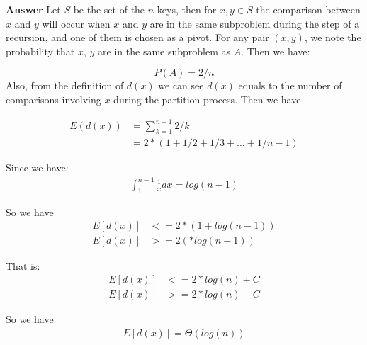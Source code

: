 \documentclass[12pt]{article}
\begin{document}
\textbf{Answer}
Let $S$ be the set of the $n$ keys, then for $x,y \in S$ the comparison between $x$ and $y$ will occur when $x$ and $y$ are in the same subproblem during the step of a recursion, and one of them is chosen as a pivot. For any pair $(x,y)$, we note the probability that $x$, $y$ are in the same subproblem as $A$. Then we have:

\begin{equation}
P(A) = 2/n
\end{equation}
Also, from the definition of $d(x)$ we can see $d(x)$ equals to the number of comparisons involving $x$ during the partition process. Then we have 

\begin{equation}
\begin{aligned}
E(d(x)) &= \sum_{k=1}^{n-1} 2/k\\
&= 2*(1 + 1/2 + 1/3 + ... + 1/n-1)
\end{aligned}
\end{equation}

Since we have:
\begin{equation}
\begin{aligned}
\int_{1}^{n-1} \frac{1}{x} dx = log(n-1)
\end{aligned}
\end{equation}

So we have
\begin{equation}
\begin{aligned}
E[d(x)] &<= 2*(1 + log(n-1))\\
E[d(x)] &>= 2(*log(n-1))
\end{aligned}
\end{equation}

That is:
\begin{equation}
\begin{aligned}
E[d(x)] &<= 2*log(n) + C\\
E[d(x)] &>= 2*log(n) - C
\end{aligned}
\end{equation}

So we have
\begin{equation}
\begin{aligned}
E[d(x)] = \Theta(log(n))\\
\end{aligned}
\end{equation}
\end{document}
